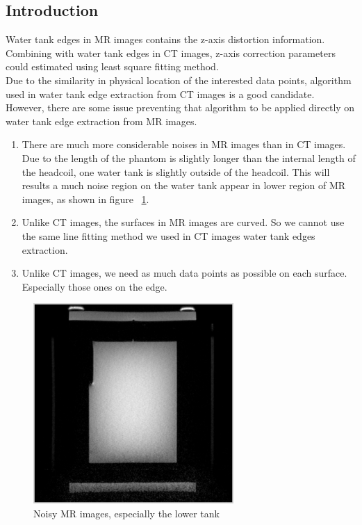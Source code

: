 
\subsection{Introduction}

Water tank edges in MR images contains the z-axis distortion information. Combining with water tank edges in 
CT images, z-axis correction parameters could estimated using least square fitting method. \\
Due to the similarity in physical location of the interested data points, algorithm used in water tank edge
extraction from CT images is a good candidate. However, there are some issue preventing that algorithm to be
applied directly on water tank edge extraction from MR images.

\begin{enumerate}
\item There are much more considerable noises in MR images than in CT images. Due to the length of the phantom 
  is slightly longer than the internal length of the headcoil, one water tank is slightly outside of the
  headcoil. This will results a much noise region on the water tank appear in lower region of MR images, as
  shown in figure ~\ref{fig:mri_noise_sample}.
\item Unlike CT images, the surfaces in MR images are curved. So we cannot use the same line fitting method
  we used in CT images water tank edges extraction.
\item Unlike CT images, we need as much data points as possible on each surface. Especially those ones on the
  edge. 
\end{enumerate}

\begin{figure}[htb]
  \hfill
  \begin{minipage}[b]{3in}
    \centering
    \centerline{\mbox{\includegraphics[width=3in]{data_extraction/images/MRI/sample_mri_phantom.eps}}}
  \end{minipage}
  \hfill
  \caption{Noisy MR images, especially the lower tank}
  \label{fig:mri_noise_sample}
\end{figure}

